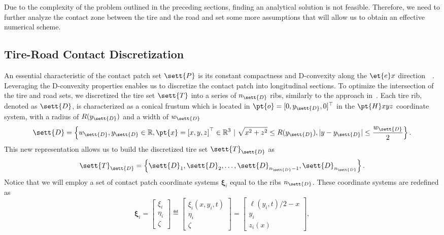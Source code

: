 Due to the complexity of the problem outlined in the preceding sections, finding an analytical solution is not feasible. Therefore, we need to further analyze the contact zone between the tire and the road and set some more assumptions that will allow us to obtain an effective numerical scheme.

\subsection{Tire-Road Contact Discretization}

An essential characteristic of the contact patch set $\sett{P}$ is its constant compactness and D-convexity along the $\et{e}x$ direction~~\cite{romano2022analytical, matouvsek2001directional}. Leveraging the D-convexity properties enables us to discretize the contact patch into longitudinal sections. To optimize the intersection of the tire and road sets, we discretized the tire set $\sett{T}$ into a series of $n_\sett{D}$ ribs, similarly to the approach in~\cite{chollet2012model, stocco2024novel}. Each tire rib, denoted as $\sett{D}$, is characterized as a conical frustum which is located in $\pt{o}= [0,y_\sett{D},0]^\top$ in the $\pt{H}xyz$ coordinate system, with a radius of $R(y_\sett{D})$ and a width of $w_\sett{D}$
%
\begin{equation}
  \sett{D} = \left\{ w_\sett{D}, y_\sett{D} \in \mathbb{R}, \pt{x} = \left[ x, y, z \right]^\top \in \mathbb{R}^3 ~|~ \sqrt{x^2+z^2} \leq R(y_\sett{D}), |y-y_\sett{D}| \leq \dfrac{w_\sett{D}}{2} \right\}.
\end{equation}
%
This new representation allows us to build the discretized tire set $\sett{T}_\sett{D}$ as
%
\begin{equation}
  \sett{T}_\sett{D} = \left\{ \sett{D}_1, \sett{D}_2, \dots, \sett{D}_{n_\sett{D}-1}, \sett{D}_{n_\sett{D}} \right\}.
\end{equation}
%
Notice that we will employ a set of contact patch coordinate systems $\bm{\xi}_i$ equal to the ribs $n_\sett{D}$. These coordinate systems are redefined as
%
\begin{equation}
  \bm{\xi}_i =
  \begin{bmatrix}
    \xi_i \\
    \eta_i \\
    \zeta
  \end{bmatrix}
  \eqdef
  \begin{bmatrix}
    \xi_i(x, y_i, t) \\
    \eta_i \\
    \zeta
  \end{bmatrix}
  =
  \begin{bmatrix}
    \ell(y_i, t)/2 - x \\
    y_i \\
    z_i(x)
  \end{bmatrix},
\end{equation}
